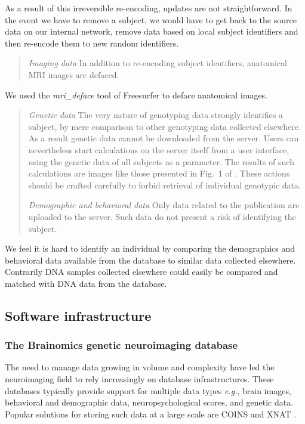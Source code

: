 \documentclass[preprint,12pt]{elsarticle}
\begin{document}
As a result of this irreversible re-encoding, updates are not straightforward. In the event we have to remove a subject, we would have to get back to the source data on our internal network, remove data based on local subject identifiers and then re-encode them to new random identifiers.

\begin{quotation}
\textit{Imaging data} In addition to re-encoding subject identifiers, anatomical MRI images are defaced.
\end{quotation}
We used the \textit{mri\_deface} tool of Freesurfer \cite{Fischl2012} to deface anatomical images.

\begin{quotation}
\textit{Genetic data} The very nature of genotyping data strongly identifies a subject, by mere comparison to other genotyping data collected elsewhere. As a result genetic data cannot be downloaded from the server. Users can nevertheless start calculations on the server itself from a user interface, using the genetic data of all subjects as a parameter. The results of such calculations are images like those presented in Fig.~1 of \cite{Pinel2012}. These actions should be crafted carefully to forbid retrieval of individual genotypic data.

\textit{Demographic and behavioral data} Only data related to the publication \cite{Pinel2007} are uploaded to the server. Such data do not present a risk of identifying the subject.
\end{quotation}
We feel it is hard to identify an individual by comparing the demographics and behavioral data available from the database to similar data collected elsewhere. Contrarily DNA samples collected elsewhere could easily be compared and matched with DNA data from the database.

\subsection{Software infrastructure}

\subsubsection{The Brainomics genetic neuroimaging database}

The need to manage data growing in volume and complexity have led the neuroimaging field to rely increasingly on database infrastructures. These databases typically provide support for multiple data types \textit{e.g.}, brain images, behavioral and demographic data, neuropsychological scores, and genetic data. Popular solutions for storing such data at a large scale are COINS \cite{COINS2011} and XNAT \cite{XNAT2007}. 
\end{document}
